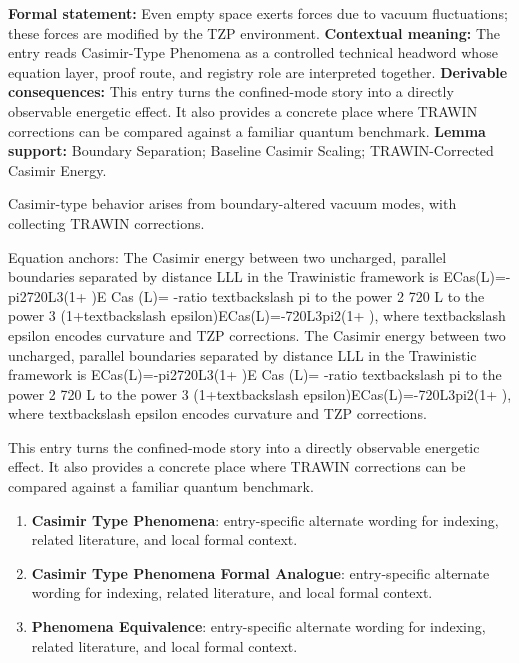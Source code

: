\begingroup\footnotesize\setlength{\emergencystretch}{3em}\sloppy
\textbf{Formal statement:} Even empty space exerts forces due to vacuum fluctuations; these forces are modified by the TZP environment. \textbf{Contextual meaning:} The entry reads Casimir-Type Phenomena as a controlled technical headword whose equation layer, proof route, and registry role are interpreted together. \textbf{Derivable consequences:} This entry turns the confined-mode story into a directly observable energetic effect. It also provides a concrete place where TRAWIN corrections can be compared against a familiar quantum benchmark. \textbf{Lemma support:} Boundary Separation; Baseline Casimir Scaling; TRAWIN-Corrected Casimir Energy.\par
\endgroup

Casimir-type behavior arises from boundary-altered vacuum modes, with collecting TRAWIN corrections.

Equation anchors: The Casimir energy between two uncharged, parallel boundaries separated by distance LLL in the Trawinistic framework is ECas(L)=-pi2720L3(1+ )E Cas (L)= -ratio textbackslash pi to the power 2 720 L to the power 3 (1+textbackslash epsilon)ECas(L)=-720L3pi2(1+ ), where  textbackslash epsilon  encodes curvature and TZP corrections. The Casimir energy between two uncharged, parallel boundaries separated by distance LLL in the Trawinistic framework is ECas(L)=-pi2720L3(1+ )E Cas (L)= -ratio textbackslash pi to the power 2 720 L to the power 3 (1+textbackslash epsilon)ECas(L)=-720L3pi2(1+ ), where  textbackslash epsilon  encodes curvature and TZP corrections.

This entry turns the confined-mode story into a directly observable energetic effect. It also provides a concrete place where TRAWIN corrections can be compared against a familiar quantum benchmark.
\endgroup

\begingroup\footnotesize\sloppy
\begin{enumerate}[leftmargin=1.35em,itemsep=1pt,topsep=1pt,parsep=0pt]
\item \textbf{Casimir Type Phenomena}: entry-specific alternate wording for indexing, related literature, and local formal context.
\item \textbf{Casimir Type Phenomena Formal Analogue}: entry-specific alternate wording for indexing, related literature, and local formal context.
\item \textbf{Phenomena Equivalence}: entry-specific alternate wording for indexing, related literature, and local formal context.
\end{enumerate}
\endgroup

